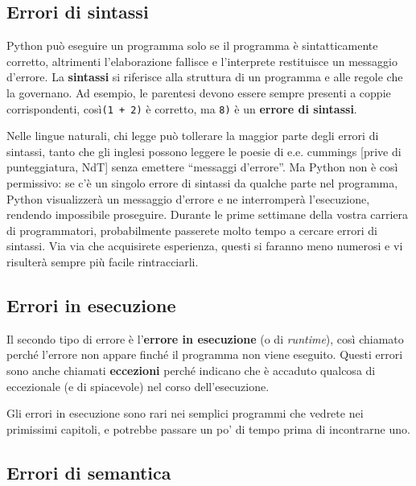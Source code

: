 \documentclass[10pt]{book}
\begin{document}
\subsection{Errori di sintassi}

Python può eseguire un programma solo se il programma è sintatticamente corretto, altrimenti l'elaborazione fallisce e l'interprete restituisce un messaggio d'errore. La {\bf sintassi} si riferisce alla struttura di un programma e alle regole che la governano. Ad esempio, le parentesi devono essere sempre presenti a coppie corrispondenti, così{\tt (1 + 2)} è corretto, ma {\tt 8)} è un {\bf errore di sintassi}.

Nelle lingue naturali, chi legge può tollerare la maggior parte degli errori di sintassi, tanto che gli inglesi possono leggere le poesie di e.e. cummings [prive di punteggiatura, NdT] senza emettere ``messaggi d'errore''. Ma Python non è così permissivo: se c'è un singolo errore di sintassi da qualche parte nel programma, Python visualizzerà un messaggio d'errore e ne interromperà l'esecuzione, rendendo impossibile proseguire. Durante le prime settimane della vostra carriera di programmatori, probabilmente passerete molto tempo a cercare errori di sintassi. Via via che acquisirete esperienza, questi si faranno meno numerosi e vi risulterà sempre più facile rintracciarli.

\subsection{Errori in esecuzione}
\label{runtime}

Il secondo tipo di errore è l'{\bf errore in esecuzione} (o di {\em runtime}), così chiamato perché l'errore non appare finché il programma non viene eseguito. Questi errori sono anche chiamati {\bf eccezioni} perché indicano che è accaduto qualcosa di eccezionale (e di spiacevole) nel corso dell'esecuzione.

Gli errori in esecuzione sono rari nei semplici programmi che vedrete nei primissimi capitoli, e potrebbe passare un po' di tempo prima di incontrarne uno.


\subsection{Errori di semantica}
\end{document}

